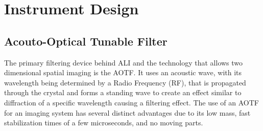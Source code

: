 \documentclass[12pt]{article}
\begin{document}
\section{Instrument Design}

\subsection{Acouto-Optical Tunable Filter}

The primary filtering device behind ALI and the technology that allows two dimensional spatial imaging is the AOTF. It uses an acoustic wave, with its wavelength being 
determined by a Radio Frequency (RF), that is propagated through the crystal and forms a standing wave to create an effect similar to diffraction of a specific wavelength 
causing a filtering effect. The use of an AOTF for an imaging system has several distinct advantages due to its low mass, fast stabilization times of a few microseconds, and no 
moving parts.
\end{document}
